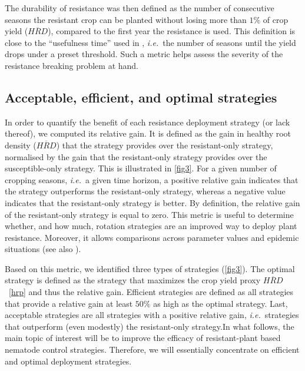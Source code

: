 {{{{The durability of resistance was then defined as the number of
consecutive seasons the resistant crop can be planted without losing
more than $1\%$ of crop yield ($\overline{HRD}$), compared to the
first year the resistance is used.  This definition is close to the
``usefulness time'' used in \citet{vandenBosch2008}, \textit{i.e.}\
the number of seasons until the yield drops under a preset
threshold. Such a metric helps assess the severity of the resistance
breaking problem at hand.

\subsection{Acceptable, efficient, and optimal strategies}

In order to quantify the benefit of each resistance deployment
strategy (or lack thereof), we computed its relative gain. It is
defined as the gain in healthy root density ($\overline{HRD}$) that
the strategy provides over the resistant-only strategy, normalised by
the gain that the resistant-only strategy provides over the
susceptible-only strategy.  This is illustrated in \autoref{fig3}.
For a given number of cropping seasons, \textit{i.e.}\ a given time
horizon, a positive relative gain indicates that the strategy
outperforms the resistant-only strategy, whereas a negative value
indicates that the resistant-only strategy is better. By definition,
the relative gain of the resistant-only strategy is equal to zero.
This metric is useful to determine whether, and how much, rotation
strategies are an improved way to deploy plant resistance. Moreover,
it allows comparisons across parameter values and epidemic situations
(see also \citet{Fabre2015}).

Based on this metric, we identified three types of strategies
(\autoref{fig3}). The optimal strategy is defined as the strategy that
maximizes the crop yield proxy $\overline{HRD}$~\eqref{hrp} and thus
the relative gain. Efficient strategies are defined as all strategies
that provide a relative gain at least $50\%$ as high as the optimal
strategy.  Last, acceptable strategies are all strategies with a
positive relative gain, \textit{i.e.}\ strategies that outperform
(even modestly) the resistant-only strategy.In what follows, the main
topic of interest will be to improve the efficacy of resistant-plant
based nematode control strategies. Therefore, we will essentially
concentrate on efficient and optimal deployment strategies.

}}}}
